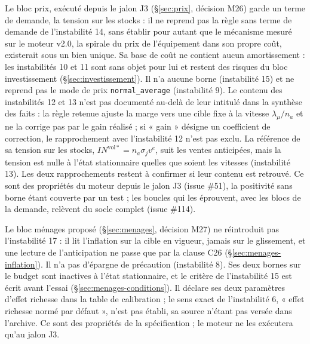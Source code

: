 \documentclass[11pt,a4paper]{article}
\begin{document}
Le bloc prix, exécuté depuis le jalon J3 (\S\ref{sec:prix}, décision M26) garde un terme de demande, la tension sur les stocks : il ne reprend pas la règle sans terme de demande de l'instabilité 14, sans établir pour autant que le mécanisme mesuré sur le moteur v2.0, la spirale du prix de l'équipement dans son propre coût, existerait sous un bien unique. Sa base de coût ne contient aucun amortissement : les instabilités 10 et 11 sont sans objet pour lui et restent des risques du bloc investissement (\S\ref{sec:investissement}). Il n'a aucune borne (instabilité 15) et ne reprend pas le mode de prix \texttt{normal\_average} (instabilité 9). Le contenu des instabilités 12 et 13 n'est pas documenté au-delà de leur intitulé dans la synthèse des faits : la règle retenue ajuste la marge vers une cible fixe à la vitesse $\lambda_\mu/n_a$ et ne la corrige pas par le gain réalisé ; si « gain » désigne un coefficient de correction, le rapprochement avec l'instabilité 12 n'est pas exclu. La référence de sa tension sur les stocks, $\mathit{IN}^{\mathrm{vol}\ast} = n_a \sigma_j v^e$, suit les ventes anticipées, mais la tension est nulle à l'état stationnaire quelles que soient les vitesses (instabilité 13). Les deux rapprochements restent à confirmer si leur contenu est retrouvé. Ce sont des propriétés du moteur depuis le jalon J3 (issue \#51), la positivité sans borne étant couverte par un test ; les boucles qui les éprouvent, avec les blocs de la demande, relèvent du socle complet (issue \#114).

Le bloc ménages proposé (\S\ref{sec:menages}, décision M27) ne réintroduit pas l'instabilité 17 : il lit l'inflation sur la cible en vigueur, jamais sur le glissement, et une lecture de l'anticipation ne passe que par la clause C26 (\S\ref{sec:menages-inflation}). Il n'a pas d'épargne de précaution (instabilité 8). Ses deux bornes sur le budget sont inactives à l'état stationnaire, et le critère de l'instabilité 15 est écrit avant l'essai (\S\ref{sec:menages-conditions}). Il déclare ses deux paramètres d'effet richesse dans la table de calibration ; le sens exact de l'instabilité 6, « effet richesse normé par défaut », n'est pas établi, sa source n'étant pas versée dans l'archive. Ce sont des propriétés de la spécification ; le moteur ne les exécutera qu'au jalon J3.
\end{document}
